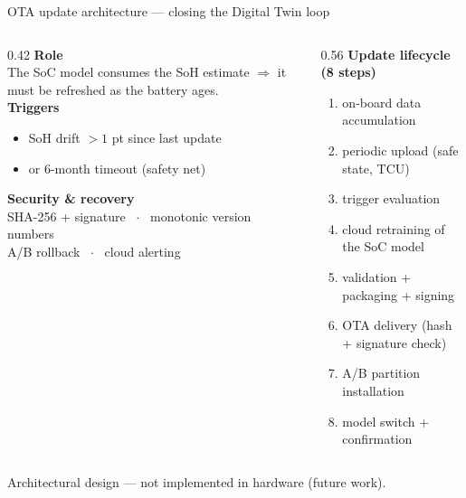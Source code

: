 \documentclass[11pt,aspectratio=169]{beamer}
\begin{document}
\begin{frame}{OTA update architecture --- closing the Digital Twin loop}
  \begin{columns}[T]
    \begin{column}{0.42\textwidth}
      \textbf{Role}\\[0.2em]
      The SoC model consumes the SoH estimate $\Rightarrow$ it must be
      refreshed as the battery ages.\\[0.6em]
      \textbf{Triggers}\\[0.2em]
      \begin{itemize}
        \item SoH drift $> 1$ pt since last update
        \item or 6-month timeout (safety net)
      \end{itemize}
      \vspace{0.4em}
      \textbf{Security \& recovery}\\[0.2em]
      {\small SHA-256 + signature \ $\cdot$ \ monotonic version numbers\\
      A/B rollback \ $\cdot$ \ cloud alerting}
    \end{column}
    \begin{column}{0.56\textwidth}
      \textbf{Update lifecycle (8 steps)}
      \begin{enumerate}
        \item on-board data accumulation
        \item periodic upload (safe state, TCU)
        \item trigger evaluation
        \item cloud retraining of the SoC model
        \item validation + packaging + signing
        \item OTA delivery (hash + signature check)
        \item A/B partition installation
        \item model switch + confirmation
      \end{enumerate}
    \end{column}
  \end{columns}
  \vspace{0.5em}
  \alert{Architectural design --- not implemented in hardware (future work).}
\end{frame}
\end{document}
